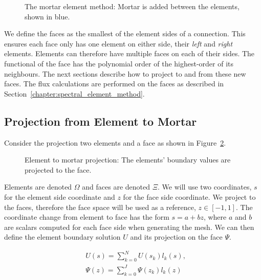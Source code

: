 \begin{figure}[H]
    \centering
    
    \caption{The mortar element method: Mortar is added between the elements, shown in blue.}\label{fig:mortar_element_method}
\end{figure}

We define the faces as the smallest of the element sides of a connection. This ensures each face
only has one element on either side, their \textit{left} and \textit{right} elements. Elements can
therefore have multiple faces on each of their sides. The functional of the face has the polynomial
order of the highest-order of its neighbours. The next sections describe how to project to and from
these new faces. The flux calculations are performed on the faces as described in
Section~\ref{chapter:spectral_element_method}. 

\subsection{Projection from Element to Mortar}\label{subsection:adaptive_mesh_refinement:mortar_element_method:element_to_mortar}

Consider the projection two elements and a face as shown in Figure~\ref{fig:element_to_mortar}.

\begin{figure}[H]
    \centering
    
    \caption{Element to mortar projection: The elements' boundary values are projected to the face.}\label{fig:element_to_mortar}
\end{figure}

Elements are denoted \(\Omega \) and faces are denoted \(\Xi \). We will use two coordinates, \(s\)
for the element side coordinate and \(z\) for the face side coordinate. We project to the faces,
therefore the face space will be used as a reference, \(z \in [-1, 1]\). The coordinate change from
element to face has the form \(s = a + bz\), where \(a\) and \(b\) are scalars computed for each
face side when generating the mesh. We can then define the element boundary solution \(U\) and its
projection on the face \(\Psi \). 

\begin{align} 
    & U(s) = \sum_{k = 0}^{N} U(s_k) l_k(s), \label{equ:element_boundary_solution} \\
    & \Psi (z) = \sum_{k = 0}^{J} \Psi(z_k) l_k(z) \label{equ:face_projected_solution}
\end{align}

